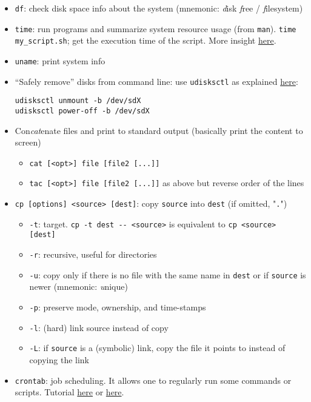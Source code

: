 \documentclass[a4paper,12pt,%
              final%
              ]{article}
\begin{document}
\begin{itemize}
  \item \texttt{df}: check disk space info about the system (mnemonic: \emph{d}isk \emph{f}ree / \emph{f}ilesystem)
  \item \texttt{time}: run programs and summarize system resource usage (from \texttt{man}). \verb|time my_script.sh|; get the execution time of the script. More insight \href{https://stackoverflow.com/questions/556405/what-do-real-user-and-sys-mean-in-the-output-of-time1/556411#556411}{here}.
  \item \texttt{uname}: print system info
  \item ``Safely remove'' disks from command line: use \texttt{udisksctl} as explained \href{https://askubuntu.com/questions/532586/what-is-the-command-line-equivalent-of-safely-remove-drive}{here}:
\begin{verbatim}
udisksctl unmount -b /dev/sdX
udisksctl power-off -b /dev/sdX
\end{verbatim}
  \item Con\emph{cat}enate files and print to standard output (basically print the content to screen)
    \begin{itemize}
      \item \verb|cat [<opt>] file [file2 [...]]|
      \item \verb|tac [<opt>] file [file2 [...]]| as above but reverse order of the lines
    \end{itemize}
  \item \verb|cp [options] <source> [dest]|: copy \texttt{source} into \texttt{dest} (if omitted, "\texttt{.}")
    \begin{itemize}
      \item \verb|-t|: target. \verb|cp -t dest -- <source>| is equivalent to \verb|cp <source> [dest]|
      \item \verb|-r|: recursive, useful for directories
      \item \verb|-u|: copy only if there is no file with the same name in \texttt{dest} or if \texttt{source} is newer (mnemonic: \emph{u}nique)
      \item \verb|-p|: preserve mode, ownership, and time-stamps
      \item \verb|-l|: (hard) link source instead of copy
      \item \verb|-L|: if \texttt{source} is a (symbolic) link, copy the file it points to instead of copying the link
    \end{itemize}
  \item \verb|crontab|: job scheduling. It allows one to regularly run some commands or scripts. Tutorial \href{https://www.adminschoice.com/crontab-quick-reference}{here} or \href{https://www.computerhope.com/unix/ucrontab.htm}{here}.

\end{itemize}
\end{document}
